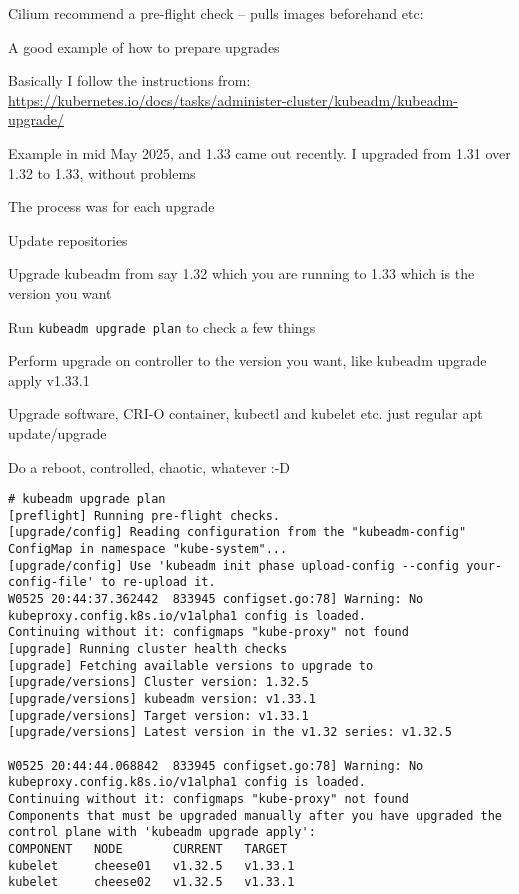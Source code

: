 \documentclass[Screen16to9,17pt]{foils}
\begin{document}
\begin{list2}
\item Cilium recommend a pre-flight check -- pulls images beforehand etc:\\
\item A good example of how to prepare upgrades
\end{list2}




Basically I follow the instructions from:\\
\url{https://kubernetes.io/docs/tasks/administer-cluster/kubeadm/kubeadm-upgrade/}

Example in mid May 2025, and 1.33 came out recently. I upgraded from 1.31 over 1.32 to 1.33, without problems

The process was for each upgrade
\begin{list2}
\item Update repositories
\item Upgrade kubeadm from say 1.32 which you are running to 1.33 which is the version you want
\item Run \verb+kubeadm upgrade plan+ to check a few things
\item Perform upgrade on controller to the version you want, like kubeadm upgrade apply v1.33.1
\item Upgrade software, CRI-O container, kubectl and kubelet etc. just regular apt update/upgrade
\item Do a reboot, controlled, chaotic, whatever :-D
\end{list2}


\begin{verbatim}
# kubeadm upgrade plan
[preflight] Running pre-flight checks.
[upgrade/config] Reading configuration from the "kubeadm-config" ConfigMap in namespace "kube-system"...
[upgrade/config] Use 'kubeadm init phase upload-config --config your-config-file' to re-upload it.
W0525 20:44:37.362442  833945 configset.go:78] Warning: No kubeproxy.config.k8s.io/v1alpha1 config is loaded.
Continuing without it: configmaps "kube-proxy" not found
[upgrade] Running cluster health checks
[upgrade] Fetching available versions to upgrade to
[upgrade/versions] Cluster version: 1.32.5
[upgrade/versions] kubeadm version: v1.33.1
[upgrade/versions] Target version: v1.33.1
[upgrade/versions] Latest version in the v1.32 series: v1.32.5

W0525 20:44:44.068842  833945 configset.go:78] Warning: No kubeproxy.config.k8s.io/v1alpha1 config is loaded.
Continuing without it: configmaps "kube-proxy" not found
Components that must be upgraded manually after you have upgraded the control plane with 'kubeadm upgrade apply':
COMPONENT   NODE       CURRENT   TARGET
kubelet     cheese01   v1.32.5   v1.33.1
kubelet     cheese02   v1.32.5   v1.33.1
\end{verbatim}
\end{document}
